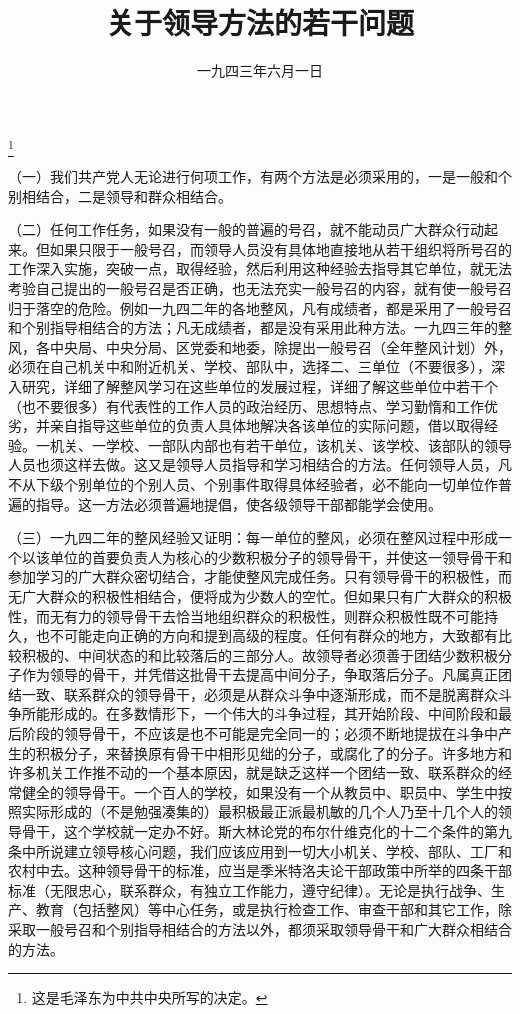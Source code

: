 
\title{关于领导方法的若干问题}
\date{一九四三年六月一日}
\thanks{这是毛泽东为中共中央所写的决定。}
\maketitle


（一）我们共产党人无论进行何项工作，有两个方法是必须采用的，一是一般和个别相结合，二是领导和群众相结合。

（二）任何工作任务，如果没有一般的普遍的号召，就不能动员广大群众行动起来。但如果只限于一般号召，而领导人员没有具体地直接地从若干组织将所号召的工作深入实施，突破一点，取得经验，然后利用这种经验去指导其它单位，就无法考验自己提出的一般号召是否正确，也无法充实一般号召的内容，就有使一般号召归于落空的危险。例如一九四二年的各地整风，凡有成绩者，都是采用了一般号召和个别指导相结合的方法；凡无成绩者，都是没有采用此种方法。一九四三年的整风，各中央局、中央分局、区党委和地委，除提出一般号召（全年整风计划）外，必须在自己机关中和附近机关、学校、部队中，选择二、三单位（不要很多），深入研究，详细了解整风学习在这些单位的发展过程，详细了解这些单位中若干个（也不要很多）有代表性的工作人员的政治经历、思想特点、学习勤惰和工作优劣，并亲自指导这些单位的负责人具体地解决各该单位的实际问题，借以取得经验。一机关、一学校、一部队内部也有若干单位，该机关、该学校、该部队的领导人员也须这样去做。这又是领导人员指导和学习相结合的方法。任何领导人员，凡不从下级个别单位的个别人员、个别事件取得具体经验者，必不能向一切单位作普遍的指导。这一方法必须普遍地提倡，使各级领导干部都能学会使用。

（三）一九四二年的整风经验又证明：每一单位的整风，必须在整风过程中形成一个以该单位的首要负责人为核心的少数积极分子的领导骨干，并使这一领导骨干和参加学习的广大群众密切结合，才能使整风完成任务。只有领导骨干的积极性，而无广大群众的积极性相结合，便将成为少数人的空忙。但如果只有广大群众的积极性，而无有力的领导骨干去恰当地组织群众的积极性，则群众积极性既不可能持久，也不可能走向正确的方向和提到高级的程度。任何有群众的地方，大致都有比较积极的、中间状态的和比较落后的三部分人。故领导者必须善于团结少数积极分子作为领导的骨干，并凭借这批骨干去提高中间分子，争取落后分子。凡属真正团结一致、联系群众的领导骨干，必须是从群众斗争中逐渐形成，而不是脱离群众斗争所能形成的。在多数情形下，一个伟大的斗争过程，其开始阶段、中间阶段和最后阶段的领导骨干，不应该是也不可能是完全同一的；必须不断地提拔在斗争中产生的积极分子，来替换原有骨干中相形见绌的分子，或腐化了的分子。许多地方和许多机关工作推不动的一个基本原因，就是缺乏这样一个团结一致、联系群众的经常健全的领导骨干。一个百人的学校，如果没有一个从教员中、职员中、学生中按照实际形成的（不是勉强凑集的）最积极最正派最机敏的几个人乃至十几个人的领导骨干，这个学校就一定办不好。斯大林论党的布尔什维克化的十二个条件的第九条中所说建立领导核心问题，我们应该应用到一切大小机关、学校、部队、工厂和农村中去。这种领导骨干的标准，应当是季米特洛夫论干部政策中所举的四条干部标准（无限忠心，联系群众，有独立工作能力，遵守纪律）。无论是执行战争、生产、教育（包括整风）等中心任务，或是执行检查工作、审查干部和其它工作，除采取一般号召和个别指导相结合的方法以外，都须采取领导骨干和广大群众相结合的方法。

